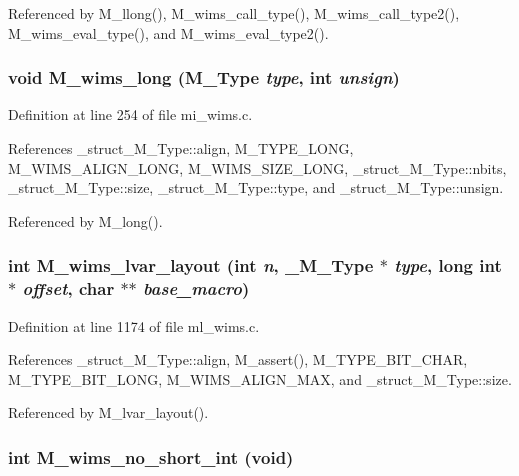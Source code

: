 Referenced by M\_\-llong(), M\_\-wims\_\-call\_\-type(), M\_\-wims\_\-call\_\-type2(), M\_\-wims\_\-eval\_\-type(), and M\_\-wims\_\-eval\_\-type2().
\subsubsection{\setlength{\rightskip}{0pt plus 5cm}void M\_\-wims\_\-long (\bf{M\_\-Type} {\em type}, int {\em unsign})}\label{m__wims_8h_10a10f2e5c558f833813506fa43d5cbc}




Definition at line 254 of file mi\_\-wims.c.

References \_\-struct\_\-M\_\-Type::align, M\_\-TYPE\_\-LONG, M\_\-WIMS\_\-ALIGN\_\-LONG, M\_\-WIMS\_\-SIZE\_\-LONG, \_\-struct\_\-M\_\-Type::nbits, \_\-struct\_\-M\_\-Type::size, \_\-struct\_\-M\_\-Type::type, and \_\-struct\_\-M\_\-Type::unsign.

Referenced by M\_\-long().
\subsubsection{\setlength{\rightskip}{0pt plus 5cm}int M\_\-wims\_\-lvar\_\-layout (int {\em n}, \bf{\_\-M\_\-Type} $\ast$ {\em type}, long int $\ast$ {\em offset}, char $\ast$$\ast$ {\em base\_\-macro})}\label{m__wims_8h_d4929aae2a0828b6dedeb6e73afef9f3}




Definition at line 1174 of file ml\_\-wims.c.

References \_\-struct\_\-M\_\-Type::align, M\_\-assert(), M\_\-TYPE\_\-BIT\_\-CHAR, M\_\-TYPE\_\-BIT\_\-LONG, M\_\-WIMS\_\-ALIGN\_\-MAX, and \_\-struct\_\-M\_\-Type::size.

Referenced by M\_\-lvar\_\-layout().
\subsubsection{\setlength{\rightskip}{0pt plus 5cm}int M\_\-wims\_\-no\_\-short\_\-int (void)}\label{m__wims_8h_971fbe33a88a0e70f29f09afaf1a126b}




